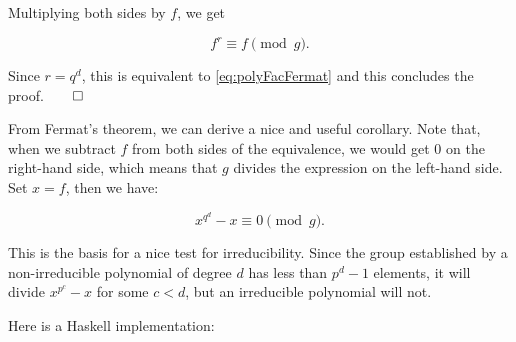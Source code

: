\documentclass[tikz]{scrreprt}
\begin{document}
Multiplying both sides by $f$, we get

\begin{equation}
f^{r} \equiv f \pmod{g}. 
\end{equation}

Since $r=q^d$, this is equivalent to \ref{eq:polyFacFermat}
and this concludes the proof.$\qed$

From Fermat's theorem, we can derive a nice and useful corollary.
Note that, when we subtract $f$ from both sides of the equivalence,
we would get 0 on the right-hand side, which means that
$g$ divides the expression on the left-hand side.
Set $x=f$, then we have:

\begin{equation}\label{eq:polyFacIrrTest}
x^{q^d} - x \equiv 0 \pmod{g}. 
\end{equation}

This is the basis for 
a nice test for irreducibility.
Since the group established by a non-irreducible
polynomial of degree $d$ has less than $p^d - 1$ elements,
it will divide $x^{p^c} - x$ for some $c<d$, but an irreducible
polynomial will not.
Here is a Haskell implementation:
\end{document}
